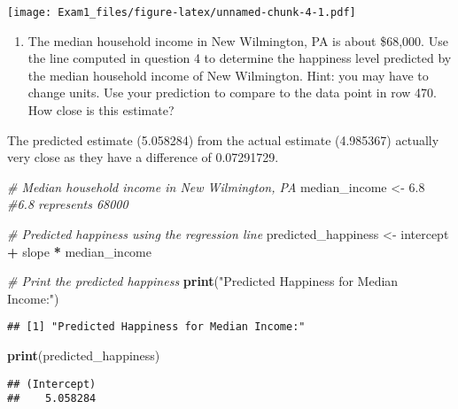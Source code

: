 \documentclass[
]{article}
\newenvironment{Shaded}{\begin{snugshade}}{\end{snugshade}}
\newcommand{\CommentTok}[1]{\textcolor[rgb]{0.56,0.35,0.01}{\textit{#1}}}
\newcommand{\DecValTok}[1]{\textcolor[rgb]{0.00,0.00,0.81}{#1}}
\newcommand{\FloatTok}[1]{\textcolor[rgb]{0.00,0.00,0.81}{#1}}
\newcommand{\FunctionTok}[1]{\textcolor[rgb]{0.13,0.29,0.53}{\textbf{#1}}}
\newcommand{\NormalTok}[1]{#1}
\newcommand{\OtherTok}[1]{\textcolor[rgb]{0.56,0.35,0.01}{#1}}
\newcommand{\SpecialCharTok}[1]{\textcolor[rgb]{0.81,0.36,0.00}{\textbf{#1}}}
\newcommand{\StringTok}[1]{\textcolor[rgb]{0.31,0.60,0.02}{#1}}
\providecommand{\tightlist}{%
  \setlength{\itemsep}{0pt}\setlength{\parskip}{0pt}}
\begin{document}
\texttt{[image: Exam1\_files/figure-latex/unnamed-chunk-4-1.pdf]}

\begin{enumerate}
\def\labelenumi{\alph{enumi})}
\setcounter{enumi}{4}
\tightlist
\item
  The median household income in New Wilmington, PA is about \$68,000.
  Use the line computed in question 4 to determine the happiness level
  predicted by the median household income of New Wilmington. Hint: you
  may have to change units. Use your prediction to compare to the data
  point in row 470. How close is this estimate?
\end{enumerate}

The predicted estimate (5.058284) from the actual estimate (4.985367)
actually very close as they have a difference of 0.07291729.

\begin{Shaded}
\begin{Highlighting}[]
\CommentTok{\# Median household income in New Wilmington, PA}
\NormalTok{median\_income }\OtherTok{\textless{}{-}} \FloatTok{6.8} \CommentTok{\#6.8 represents 68000}

\CommentTok{\# Predicted happiness using the regression line}
\NormalTok{predicted\_happiness }\OtherTok{\textless{}{-}}\NormalTok{ intercept }\SpecialCharTok{+}\NormalTok{ slope }\SpecialCharTok{*}\NormalTok{ median\_income}

\CommentTok{\# Print the predicted happiness}
\FunctionTok{print}\NormalTok{(}\StringTok{"Predicted Happiness for Median Income:"}\NormalTok{)}
\end{Highlighting}
\end{Shaded}

\begin{verbatim}
## [1] "Predicted Happiness for Median Income:"
\end{verbatim}

\begin{Shaded}
\begin{Highlighting}[]
\FunctionTok{print}\NormalTok{(predicted\_happiness)}
\end{Highlighting}
\end{Shaded}

\begin{verbatim}
## (Intercept) 
##    5.058284
\end{verbatim}

\begin{Shaded}
\end{Shaded}
\end{document}
